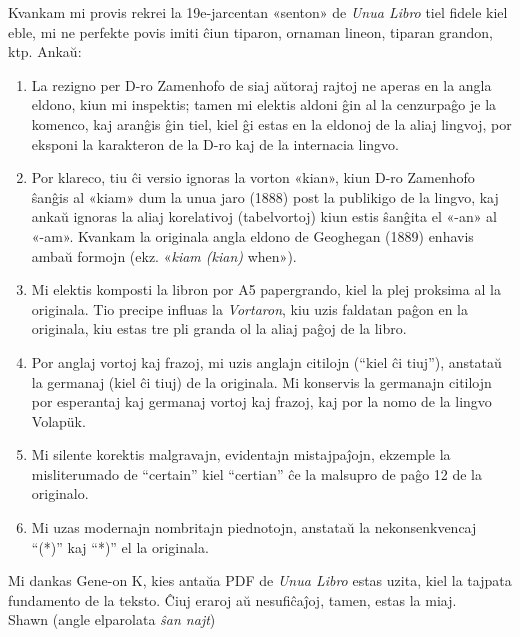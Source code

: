 \kolofono

\small Kvankam mi provis rekrei la 19e-jarcentan «senton» de \emph{Unua Libro} tiel fidele kiel eble, mi ne perfekte povis imiti ĉiun tiparon, ornaman lineon, tiparan grandon, ktp.  Ankaŭ:

\begin{enumerate}

\item La rezigno per D-ro Zamenhofo de siaj aŭtoraj rajtoj ne aperas en la angla eldono, kiun mi inspektis; tamen mi elektis aldoni ĝin al la cenzurpaĝo je la komenco, kaj aranĝis ĝin tiel, kiel ĝi estas en la eldonoj de la aliaj lingvoj, por eksponi la karakteron de la D-ro kaj de la internacia lingvo.

\item Por klareco, tiu ĉi versio ignoras la vorton «kian», kiun D-ro Zamenhofo ŝanĝis al «kiam» dum la unua jaro (1888) post la publikigo de la lingvo, kaj ankaŭ ignoras la aliaj korelativoj (tabelvortoj) kiun estis ŝanĝita el «-an» al «-am». Kvankam la originala angla eldono de Geoghegan (1889) enhavis ambaŭ formojn (ekz. «\emph{kiam (kian)} when»).

\item Mi elektis komposti la libron por A5 papergrando, kiel la plej proksima al la originala.  Tio precipe influas la \emph{Vortaron}, kiu uzis faldatan paĝon en la originala, kiu estas tre pli granda ol la aliaj paĝoj de la libro.

\item Por anglaj vortoj kaj frazoj, mi uzis anglajn citilojn (``kiel ĉi tiuj''), anstataŭ la germanaj (\glqq{}kiel ĉi tiuj\grqq{}) de la originala.  Mi konservis la germanajn citilojn por esperantaj kaj germanaj vortoj kaj frazoj, kaj por la nomo de la lingvo Volap\"{u}k.

\item Mi silente korektis malgravajn, evidentajn mistajpaĵojn, ekzemple la misliterumado de ``certain'' kiel ``certian'' ĉe la malsupro de paĝo 12 de la originalo.

\item Mi uzas modernajn nombritajn piednotojn, anstataŭ la nekonsenkvencaj ``(*)'' kaj ``*)'' el la originala.

\end{enumerate}

Mi dankas Gene-on K, kies antaŭa PDF de \emph{Unua Libro} estas uzita, kiel la tajpata fundamento de la teksto.  Ĉiuj eraroj aŭ nesufiĉaĵoj, tamen, estas la miaj.\\[1ex]

{\setlength{\parindent}{0em}
Shawn  (angle elparolata \emph{ŝan najt})\\
\hodiau}